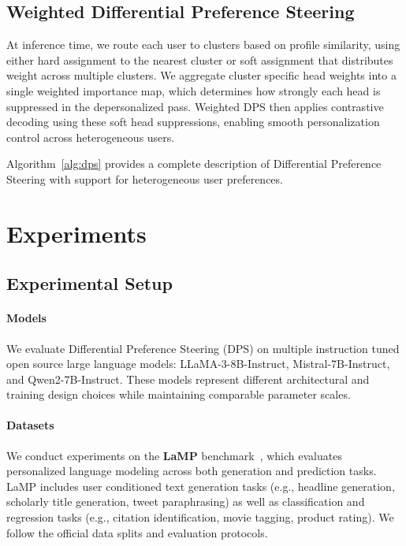 \documentclass[11pt]{article}
\begin{document}
\subsection{Weighted Differential Preference Steering}

At inference time, we route each user to clusters based on profile similarity, using either hard assignment to the nearest cluster or soft assignment that distributes weight across multiple clusters.
We aggregate cluster specific head weights into a single weighted importance map, which determines how strongly each head is suppressed in the depersonalized pass.
Weighted DPS then applies contrastive decoding using these soft head suppressions, enabling smooth personalization control across heterogeneous users.

Algorithm~\ref{alg:dps} provides a complete description of Differential Preference Steering with support for heterogeneous user preferences.



\section{Experiments}




\subsection{Experimental Setup}

\paragraph{Models}
We evaluate Differential Preference Steering (DPS) on multiple instruction tuned open source large language models:
LLaMA-3-8B-Instruct,
Mistral-7B-Instruct,
and Qwen2-7B-Instruct.
These models represent different architectural and training design choices while maintaining comparable parameter scales.

\paragraph{Datasets}
We conduct experiments on the \textbf{LaMP} benchmark~\cite{DBLP:conf/acl/SalemiMBZ24}, which evaluates personalized language modeling across both generation and prediction tasks.
LaMP includes user conditioned text generation tasks (e.g., headline generation, scholarly title generation, tweet paraphrasing) as well as classification and regression tasks (e.g., citation identification, movie tagging, product rating).
We follow the official data splits and evaluation protocols.
\end{document}
